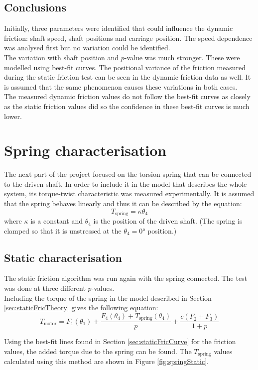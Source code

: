 \documentclass[12pt]{article}
\begin{document}
\subsection{Conclusions}
Initially, three parameters were identified that could influence the dynamic friction: shaft speed, shaft positions and carriage position. The speed dependence was analysed first but no variation could be identified. \\

The variation with shaft position and $p$-value was much stronger. These were modelled using best-fit curves. The positional variance of the friction measured during the static friction test can be seen in the dynamic friction data as well. It is assumed that the same phenomenon causes these variations in both cases.\\

The measured dynamic friction values do not follow the best-fit curves as closely as the static friction values did so the confidence in these best-fit curves is much lower.

\clearpage
\section{Spring characterisation}
\label{sec:spring}
The next part of the project focused on the torsion spring that can be connected to the driven shaft. In order to include it in the model that describes the whole system, its torque-twist characteristic was measured experimentally. It is assumed that the spring behaves linearly and thus it can be described by the equation:
$$T_{\text{spring}} = \kappa \theta_4 $$
where $\kappa$ is a constant and $\theta_4$ is the position of the driven shaft. (The spring is clamped so that it is unstressed at the $\theta_4 = 0$° position.) 

\subsection{Static characterisation}
The static friction algorithm was run again with the spring connected. The test was done at three different $p$-values. \\

Including the torque of the spring in the model described in Section \ref{sec:staticFricTheory} gives the following equation:
$$T_{\text{motor}} = F_1(\theta_1) + \frac{F_4(\theta_4)+ T_{\text{spring}}(\theta_4)}{p} + \frac{c(F_2+F_3)}{1+p}$$

Using the best-fit lines found in Section \ref{sec:staticFricCurve} for the friction values, the added torque due to the spring can be found. The $T_{\text{spring}}$ values calculated using this method are shown in Figure \ref{fig:springStatic}. 
\end{document}
